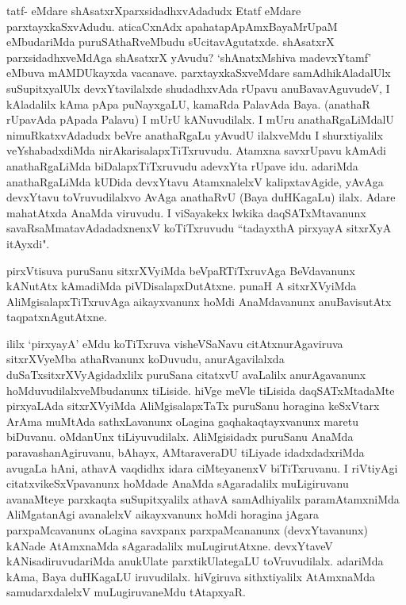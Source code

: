 
\begin{artha}
tatf- eMdare shAsatxrXparxsidadhxvAdadudx Etatf eMdare parxtayxkaSxvAdudu. aticaCxnAdx apahatapApAmx\s BayaMrUpaM eMbudariMda puruSAthaRveMbudu sUcitavAgutatxde. shAsatxrX parxsidadhxveMdAga shAsatxrX yAvudu?  `shAnatxMshiva madevxYtamf' eMbuva mAMDUkayxda vacanave. parxtayxkaSxveMdare samAdhikAladalUlx suSupitxyalUlx devxYtavilalxde shudadhxvAda rUpavu anuBavavAguvudeV, I kAladalilx kAma pApa puNayxgaLU, kamaRda PalavAda Baya. (anathaR rUpavAda pApada Palavu) I mUrU kANuvudilalx. I mUru anathaRgaLiMdalU nimuRkatxvAdadudx beVre anathaRgaLu yAvudU ilalxveMdu I shurxtiyalilx veYshabadxdiMda nirAkarisalapxTiTxruvudu. Atamxna savxrUpavu kAmAdi anathaRgaLiMda biDalapxTiTxruvudu adevxYta rUpave idu. adariMda anathaRgaLiMda kUDida devxYtavu AtamxnalelxV kalipxtavAgide, yAvAga devxYtavu toVruvudilalxvo AvAga anathaRvU (Baya duHKagaLu) ilalx. Adare mahatAtxda AnaMda viruvudu. I viSayakekx lwkika daqSATxMtavanunx savaRsaMmatavAdadadxnenxV koTiTxruvudu ``tadayxthA pirxyayA sitxrXyA itAyxdi".
\end{artha}

\begin{artha}%
pirxVtisuva puruSanu sitxrXVyiMda beVpaRTiTxruvAga BeVdavanunx kANutAtx kAmadiMda piVDisalapxDutAtxne. punaH A sitxrXVyiMda AliMgisalapxTiTxruvAga aikayxvanunx hoMdi AnaMdavanunx anuBavisutAtx taqpatxnAgutAtxne. 
\end{artha}

\begin{artha}
ililx `pirxyayA' eMdu koTiTxruva visheVSaNavu citAtxnurAgaviruva sitxrXVyeMba athaRvanunx koDuvudu, anurAgavilalxda duSaTxsitxrXVyAgidadxlilx puruSana citatxvU avaLalilx anurAgavanunx hoMduvudilalxveMbudanunx tiLiside. hiVge meVle tiLisida daqSATxMtadaMte pirxyaLAda sitxrXVyiMda AliMgisalapxTaTx puruSanu horagina keSxVtarx ArAma muMtAda sathxLavanunx oLagina gaqhakaqtayxvanunx maretu biDuvanu. oMdanUnx tiLiyuvudilalx. AliMgisidadx puruSanu AnaMda paravashanAgiruvanu, bAhayx, AMtaraveraDU tiLiyade idadxdadxriMda avugaLa hAni, athavA vaqdidhx idara ciMteyanenxV biTiTxruvanu. I riVtiyAgi citatxvikeSxVpavanunx hoMdade AnaMda sAgaradalilx muLigiruvanu avanaMteye parxkaqta suSupitxyalilx athavA samAdhiyalilx paramAtamxniMda AliMgatanAgi avanalelxV aikayxvanunx hoMdi horagina jAgara parxpaMcavanunx oLagina savxpanx parxpaMcananunx (devxYtavanunx) kANade AtAmxnaMda sAgaradalilx muLugirutAtxne. devxYtaveV kANisadiruvudariMda anukUlate parxtikUlategaLU toVruvudilalx. adariMda kAma, Baya duHKagaLU iruvudilalx. hiVgiruva sithxtiyalilx AtAmxnaMda samudarxdalelxV muLugiruvaneMdu tAtapxyaR.
\end{artha}

